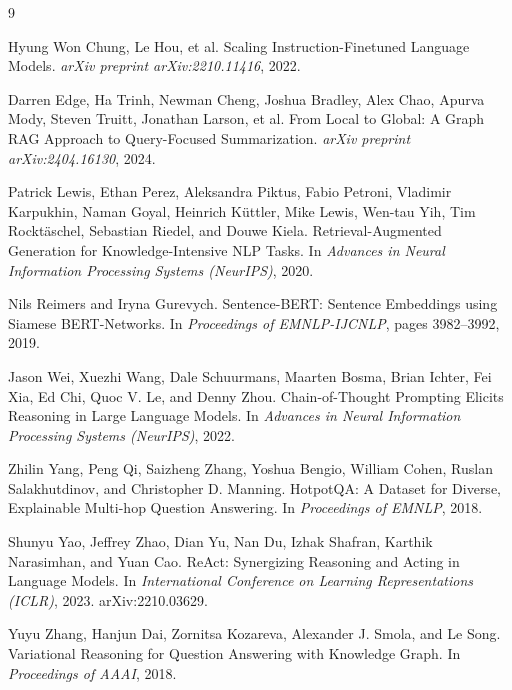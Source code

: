 \documentclass[11pt]{article}
\begin{document}

\begin{thebibliography}{9}

Hyung Won Chung, Le Hou, et al.
\newblock Scaling Instruction-Finetuned Language Models.
\newblock \emph{arXiv preprint arXiv:2210.11416}, 2022.

Darren Edge, Ha Trinh, Newman Cheng, Joshua Bradley, Alex Chao, Apurva Mody, Steven Truitt, Jonathan Larson, et al.
\newblock From Local to Global: A Graph RAG Approach to Query-Focused Summarization.
\newblock \emph{arXiv preprint arXiv:2404.16130}, 2024.

Patrick Lewis, Ethan Perez, Aleksandra Piktus, Fabio Petroni, Vladimir Karpukhin, Naman Goyal, Heinrich K{\"u}ttler, Mike Lewis, Wen-tau Yih, Tim Rockt{\"a}schel, Sebastian Riedel, and Douwe Kiela.
\newblock Retrieval-Augmented Generation for Knowledge-Intensive NLP Tasks.
\newblock In \emph{Advances in Neural Information Processing Systems (NeurIPS)}, 2020.

Nils Reimers and Iryna Gurevych.
\newblock Sentence-BERT: Sentence Embeddings using Siamese BERT-Networks.
\newblock In \emph{Proceedings of EMNLP-IJCNLP}, pages 3982--3992, 2019.

Jason Wei, Xuezhi Wang, Dale Schuurmans, Maarten Bosma, Brian Ichter, Fei Xia, Ed Chi, Quoc V. Le, and Denny Zhou.
\newblock Chain-of-Thought Prompting Elicits Reasoning in Large Language Models.
\newblock In \emph{Advances in Neural Information Processing Systems (NeurIPS)}, 2022.

Zhilin Yang, Peng Qi, Saizheng Zhang, Yoshua Bengio, William Cohen, Ruslan Salakhutdinov, and Christopher D. Manning.
\newblock HotpotQA: A Dataset for Diverse, Explainable Multi-hop Question Answering.
\newblock In \emph{Proceedings of EMNLP}, 2018.

Shunyu Yao, Jeffrey Zhao, Dian Yu, Nan Du, Izhak Shafran, Karthik Narasimhan, and Yuan Cao.
\newblock ReAct: Synergizing Reasoning and Acting in Language Models.
\newblock In \emph{International Conference on Learning Representations (ICLR)}, 2023. arXiv:2210.03629.

Yuyu Zhang, Hanjun Dai, Zornitsa Kozareva, Alexander J. Smola, and Le Song.
\newblock Variational Reasoning for Question Answering with Knowledge Graph.
\newblock In \emph{Proceedings of AAAI}, 2018.

\end{thebibliography}
\end{document}
